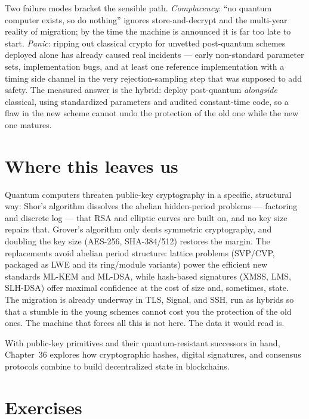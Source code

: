 \begin{trapbox}
Two failure modes bracket the sensible path. \emph{Complacency}: ``no quantum computer exists, so do nothing'' ignores store-and-decrypt and the multi-year reality of migration; by the time the machine is announced it is far too late to start. \emph{Panic}: ripping out classical crypto for unvetted post-quantum schemes deployed alone has already caused real incidents --- early non-standard parameter sets, implementation bugs, and at least one reference implementation with a timing side channel in the very rejection-sampling step that was supposed to add safety. The measured answer is the hybrid: deploy post-quantum \emph{alongside} classical, using standardized parameters and audited constant-time code, so a flaw in the new scheme cannot undo the protection of the old one while the new one matures.
\end{trapbox}

\section{Where this leaves us}
\label{ch35:summary}

Quantum computers threaten public-key cryptography in a specific, structural way: Shor's algorithm dissolves the abelian hidden-period problems --- factoring and discrete log --- that RSA and elliptic curves are built on, and no key size repairs that. Grover's algorithm only dents symmetric cryptography, and doubling the key size (AES-256, SHA-384/512) restores the margin. The replacements avoid abelian period structure: lattice problems (SVP/CVP, packaged as LWE and its ring/module variants) power the efficient new standards ML-KEM and ML-DSA, while hash-based signatures (XMSS, LMS, SLH-DSA) offer maximal confidence at the cost of size and, sometimes, state. The migration is already underway in TLS, Signal, and SSH, run as hybrids so that a stumble in the young schemes cannot cost you the protection of the old ones. The machine that forces all this is not here. The data it would read is.

With public-key primitives and their quantum-resistant successors in hand, Chapter~36 explores how cryptographic hashes, digital signatures, and consensus protocols combine to build decentralized state in blockchains.

\section{Exercises}
\label{ch35:exercises}

